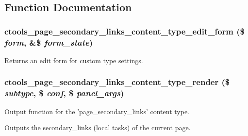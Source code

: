 \subsection{Function Documentation}
\hypertarget{page__secondary__links_8inc_a9412679882decfc17a4701f5bedabd98}{
\subsubsection[{ctools\_\-page\_\-secondary\_\-links\_\-content\_\-type\_\-edit\_\-form}]{\setlength{\rightskip}{0pt plus 5cm}ctools\_\-page\_\-secondary\_\-links\_\-content\_\-type\_\-edit\_\-form (\$ {\em form}, \/  \&\$ {\em form\_\-state})}}
\label{page__secondary__links_8inc_a9412679882decfc17a4701f5bedabd98}
Returns an edit form for custom type settings. \hypertarget{page__secondary__links_8inc_a2164c92a3692b3cf0fd91cef460f6c80}{
\subsubsection[{ctools\_\-page\_\-secondary\_\-links\_\-content\_\-type\_\-render}]{\setlength{\rightskip}{0pt plus 5cm}ctools\_\-page\_\-secondary\_\-links\_\-content\_\-type\_\-render (\$ {\em subtype}, \/  \$ {\em conf}, \/  \$ {\em panel\_\-args})}}
\label{page__secondary__links_8inc_a2164c92a3692b3cf0fd91cef460f6c80}
Output function for the 'page\_\-secondary\_\-links' content type.

Outputs the secondary\_\-links (local tasks) of the current page. 

